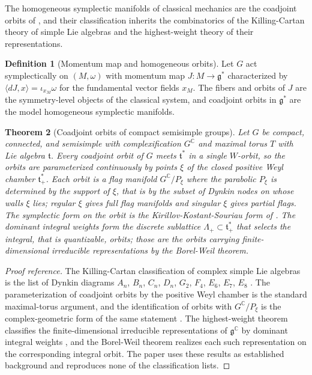 \documentclass[11pt,letterpaper]{article}
\newtheorem{theorem}{Theorem}[section]
\theoremstyle{definition}
\newtheorem{definition}[theorem]{Definition}
\theoremstyle{remark}
\begin{document}
The homogeneous symplectic manifolds of classical mechanics are the coadjoint orbits of , and their classification inherits the combinatorics of the Killing-Cartan theory of simple Lie algebras and the highest-weight theory of their representations.

\begin{definition}[Momentum map and homogeneous orbits]
\label{def:momentum}
Let $G$ act symplectically on $(M, \omega)$ with momentum map $J : M \to \mathfrak{g}^{*}$ characterized by $\langle dJ, x \rangle = \iota_{x_M} \omega$ for the fundamental vector fields $x_M$. The fibers and orbits of $J$ are the symmetry-level objects of the classical system, and coadjoint orbits in $\mathfrak{g}^{*}$ are the model homogeneous symplectic manifolds.
\end{definition}

\begin{theorem}[Coadjoint orbits of compact semisimple groups]
\label{thm:coadjoint-classification}
Let $G$ be compact, connected, and semisimple with complexification $G^{\mathbb{C}}$ and maximal torus $T$ with Lie algebra $\mathfrak{t}$. Every coadjoint orbit of $G$ meets $\mathfrak{t}^{*}$ in a single $W$-orbit, so the orbits are parameterized continuously by points $\xi$ of the closed positive Weyl chamber $\mathfrak{t}^{*}_{+}$. Each orbit is a flag manifold $G^{\mathbb{C}} / P_{\xi}$ where the parabolic $P_{\xi}$ is determined by the support of $\xi$, that is by the subset of Dynkin nodes on whose walls $\xi$ lies; regular $\xi$ gives full flag manifolds and singular $\xi$ gives partial flags. The symplectic form on the orbit is the Kirillov-Kostant-Souriau form of . The dominant integral weights form the discrete sublattice $\Lambda_{+} \subset \mathfrak{t}^{*}_{+}$ that selects the integral, that is quantizable, orbits; those are the orbits carrying finite-dimensional irreducible representations by the Borel-Weil theorem.
\end{theorem}

\begin{proof}[Proof reference]
The Killing-Cartan classification of complex simple Lie algebras is the list of Dynkin diagrams $A_n$, $B_n$, $C_n$, $D_n$, $G_2$, $F_4$, $E_6$, $E_7$, $E_8$ \cite{humphreys}. The parameterization of coadjoint orbits by the positive Weyl chamber is the standard maximal-torus argument, and the identification of orbits with $G^{\mathbb{C}} / P_{\xi}$ is the complex-geometric form of the same statement \cite{kirillov}. The highest-weight theorem classifies the finite-dimensional irreducible representations of $\mathfrak{g}^{\mathbb{C}}$ by dominant integral weights \cite{humphreys}, and the Borel-Weil theorem realizes each such representation on the corresponding integral orbit. The paper uses these results as established background and reproduces none of the classification lists.
\end{proof}
\end{document}
